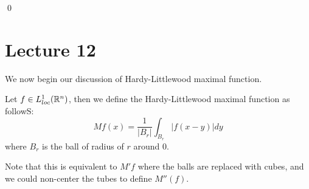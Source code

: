 \qed



\section{Lecture 12}
We now begin our discussion of Hardy-Littlewood maximal function.


\begin{definition}
    Let $f\in L_{loc}^1(\mathbb{R}^n)$, then we define the Hardy-Littlewood maximal function as followS:
    \begin{equation*}
        Mf(x)=\frac{1}{|B_r|}\int_{B_r}|f(x-y)|dy
    \end{equation*}
    where $B_r$ is the ball of radius of $r$ around 0. 
\end{definition}
Note that this is equivalent to $M'f$ where the balls are replaced with cubes, and we could non-center the tubes to define $M''(f)$.

